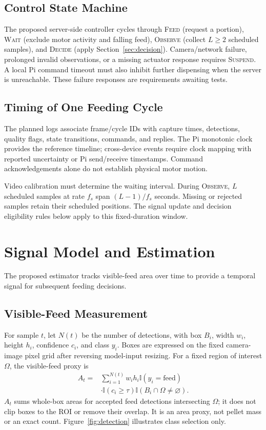\documentclass[10pt,conference,letterpaper]{IEEEtran}
\begin{document}
\subsection{Control State Machine}
The proposed server-side controller cycles through \textsc{Feed} (request a portion), \textsc{Wait} (exclude motor activity and falling feed), \textsc{Observe} (collect $L\geq2$ scheduled samples), and \textsc{Decide} (apply Section~\ref{sec:decision}). Camera/network failure, prolonged invalid observations, or a missing actuator response requires \textsc{Suspend}. A local Pi command timeout must also inhibit further dispensing when the server is unreachable. These failure responses are requirements awaiting tests.

\subsection{Timing of One Feeding Cycle}
The planned logs associate frame/cycle IDs with capture times, detections, quality flags, state transitions, commands, and replies. The Pi monotonic clock provides the reference timeline; cross-device events require clock mapping with reported uncertainty or Pi send/receive timestamps. Command acknowledgements alone do not establish physical motor motion.

Video calibration must determine the waiting interval. During \textsc{Observe}, $L$ scheduled samples at rate $f_s$ span $(L-1)/f_s$ seconds. Missing or rejected samples retain their scheduled positions. The signal update and decision eligibility rules below apply to this fixed-duration window.

\section{Signal Model and Estimation}
The proposed estimator tracks visible-feed area over time to provide a temporal signal for subsequent feeding decisions.

\subsection{Visible-Feed Measurement}
For sample $t$, let $N(t)$ be the number of detections, with box $B_i$, width $w_i$, height $h_i$, confidence $c_i$, and class $y_i$. Boxes are expressed on the fixed camera-image pixel grid after reversing model-input resizing. For a fixed region of interest $\Omega$, the visible-feed proxy is
\begin{equation}
\begin{aligned}
A_t={}&\sum_{i=1}^{N(t)}w_i h_i\mathbb{I}(y_i=\mathrm{feed})\\
&\cdot\mathbb{I}(c_i\geq\tau)\mathbb{I}(B_i\cap\Omega\neq\varnothing).
\end{aligned}
\label{eq:area}
\end{equation}
$A_t$ sums whole-box areas for accepted feed detections intersecting $\Omega$; it does not clip boxes to the ROI or remove their overlap. It is an area proxy, not pellet mass or an exact count. Figure~\ref{fig:detection} illustrates class selection only.
\end{document}
